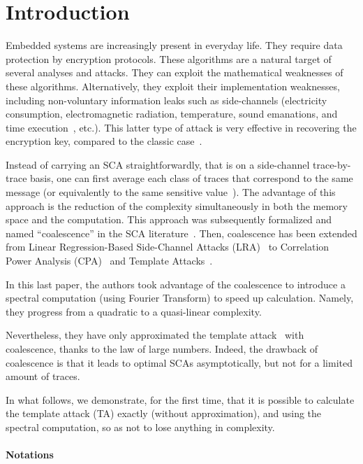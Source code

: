 \documentclass[conference,twocolumn]{IEEEtran}
\begin{document}
\section{Introduction}

Embedded systems are increasingly present in everyday life. 
They require data protection by encryption protocols. 
These algorithms are a natural target of several analyses and attacks. 
They can exploit the mathematical weaknesses of these algorithms.
Alternatively, they exploit their implementation weaknesses, including non-voluntary information leaks such as side-channels (electricity consumption, electromagnetic radiation, temperature, sound emanations, and time execution~\cite{DBLP:conf/crypto/Kocher96}, etc.). 
This latter type of attack is very effective in recovering the encryption key, compared to the classic case~\cite{Kocher99differentialpower}.

Instead of carrying an SCA straightforwardly, that is on a side-channel trace-by-trace basis, one can first average each class of traces that correspond to the same message (or equivalently to the same sensitive value~\cite{DBLP:conf/pkc/Schindler05}).
The advantage of this approach is the reduction of the complexity simultaneously in both the memory space and the computation.
This approach was subsequently formalized and named ``coalescence'' in the SCA literature~\cite{ouladj2021side}. Then, coalescence has been extended from Linear Regression-Based Side-Channel Attacks (LRA)~\cite{DBLP:conf/cosade/OULADJ2020} to Correlation Power Analysis (CPA)~\cite[Chap.6]{ouladj2021side} and Template Attacks~\cite{OULADJ2019}. 


In this last paper, the authors took advantage of the coalescence to introduce a spectral computation (using Fourier Transform) to speed up calculation. 
Namely, they progress from a quadratic to a quasi-linear complexity.

Nevertheless, they have only approximated the template attack~\cite{DBLP:conf/ches/ChariRR02} with coalescence, thanks to the law of large numbers.
Indeed, the drawback of coalescence is that it leads to optimal SCAs asymptotically, but not for a limited amount of traces.


In what follows, we demonstrate, for the first time, that it is possible to calculate the template attack (TA) exactly (without approximation), and using the spectral computation, so as not to lose anything in complexity. 


\paragraph{Notations}
\end{document}

